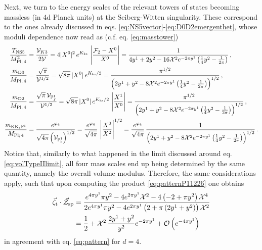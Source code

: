 Next, we turn to the energy scales of the relevant towers of states becoming massless (in 4d Planck units) at the Seiberg-Witten singularity. These correspond to the ones already discussed in eqs. \eqref{eq:NS5vector}-\eqref{eq:D0D2emergenthet}, whose moduli dependence now read as (c.f. eq. \eqref{eq:masstower})
%
\begin{equation}\label{eq:BPSmassesSW}
	\begin{aligned}
	\frac{T_{\text{NS5}}}{M_{\text{Pl;}\, 4}^2} &= \frac{\mathcal{V}_{K3}}{ 2 \mathcal{V}} = 4|X^0|^2\,  e^{K_{\rm ks}}\, \left|\frac{\mathcal{F}_2-X^0}{X^0}\right| = \frac{1}{4 y^1 + 2y^2 - 16 \mathcal{X}^2 e^{-2 \pi y^1} \left( \frac14 y^2 - \frac{1}{2\pi}\right)}\, ,\\
    \frac{m_{\text{D0}}}{M_{\text{Pl;}\, 4}} &= \frac{\sqrt{\pi}}{\mathcal{V}^{1/2}} = \sqrt{8 \pi}\, |X^0|\,  e^{K_{\rm ks}/2} = \frac{\pi^{1/2}}{\left( 2 y^1 + y^2 - 8 \mathcal{X}^2 e^{-2 \pi y^1} \left( \frac14 y^2 - \frac{1}{2\pi}\right)\right)^{1/2}}\, ,\\
    \frac{m_{\text{D2}}}{M_{\text{Pl;}\, 4}} &= \frac{\sqrt{\pi}\, \mathcal{V}_{\mathbb{P}_f^1}}{\mathcal{V}^{1/2}} = \sqrt{8 \pi}\, |X^0|\,  e^{K_{\rm ks}/2}\,  \left|\frac{X^1}{X^0}\right| = \frac{\pi^{1/2}}{\left( 2 y^1 + y^2 - 8 \mathcal{X}^2 e^{-2 \pi y^1} \left( \frac14 y^2 - \frac{1}{2\pi}\right)\right)^{1/2}}\, ,\\
    \frac{m_{\text{KK}, \, \mathbb{P}^1}}{M_{\text{Pl;}\, 4}} &= \frac{e^{\varphi_4}}{\sqrt{4 \pi} \left(\mathcal{V}_{\mathbb{P}_b^1} \right)^{1/2}} = \frac{e^{\varphi_4}}{\sqrt{4 \pi}}\, \left|\frac{X^0}{X^2}\right|^{1/2} =\frac{e^{\varphi_4}}{\sqrt{4 \pi}}\, \frac{1}{\left( 2 y^1 + y^2 - 8 \mathcal{X}^2 e^{-2 \pi y^1} \left( \frac14 y^2 - \frac{1}{2\pi}\right)\right)^{1/2}}\, .
	\end{aligned}
\end{equation}
%
Notice that, similarly to what happened in the limit discussed around eq. \eqref{eq:volTypeIIlimit}, all four mass scales end up being determined by the same quantity, namely the overall volume modulus. Therefore, the same considerations apply, such that upon computing the product \eqref{eq:patternP11226} one obtains
%
\begin{equation}\label{eq:NS5norm}
  \begin{aligned}
	 \vec{\zeta}_{\text{t}}\cdot\vec{\mathcal{Z}}_{\rm sp} &= \frac{e^{4\pi y^1} \pi y^2 -4e^{2\pi y^1} \mathcal{X}^2-4 \left( -2+\pi y^2\right) \mathcal{X}^4}{2e^{4\pi y^1} \pi y^2 -4e^{2\pi y^1} \left(2+\pi \left(2y^1 + y^2\right)\right) \mathcal{X}^2}\\
     &= \frac{1}{2} + \mathcal{X}^2\, \frac{2y^1+y^2}{y^2} e^{-2\pi y^1} + \mathcal{O}\left( e^{-4\pi y^1}\right)\; 
  \end{aligned}
\end{equation}
%
in agreement with eq. \eqref{eq:pattern} for $d=4$.
	
